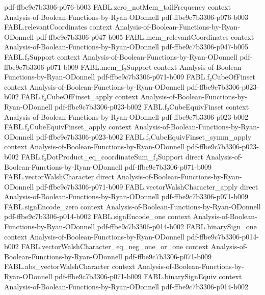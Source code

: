 \begin{theorem}
  {pdf-ffbe9c7b3306-p076-b003}
\proofstep
  {FABL.zero_notMem_tailFrequency}
  {context}
  {Analysis-of-Boolean-Functions-by-Ryan-ODonnell}
  {pdf-ffbe9c7b3306-p076-b003}
\proofstep
  {FABL.relevantCoordinates}
  {context}
  {Analysis-of-Boolean-Functions-by-Ryan-ODonnell}
  {pdf-ffbe9c7b3306-p047-b005}
\proofstep
  {FABL.mem_relevantCoordinates}
  {context}
  {Analysis-of-Boolean-Functions-by-Ryan-ODonnell}
  {pdf-ffbe9c7b3306-p047-b005}
\proofstep
  {FABL.f₂Support}
  {context}
  {Analysis-of-Boolean-Functions-by-Ryan-ODonnell}
  {pdf-ffbe9c7b3306-p071-b009}
\proofstep
  {FABL.mem_f₂Support}
  {context}
  {Analysis-of-Boolean-Functions-by-Ryan-ODonnell}
  {pdf-ffbe9c7b3306-p071-b009}
\proofstep
  {FABL.f₂CubeOfFinset}
  {context}
  {Analysis-of-Boolean-Functions-by-Ryan-ODonnell}
  {pdf-ffbe9c7b3306-p023-b002}
\proofstep
  {FABL.f₂CubeOfFinset_apply}
  {context}
  {Analysis-of-Boolean-Functions-by-Ryan-ODonnell}
  {pdf-ffbe9c7b3306-p023-b002}
\proofstep
  {FABL.f₂CubeEquivFinset}
  {context}
  {Analysis-of-Boolean-Functions-by-Ryan-ODonnell}
  {pdf-ffbe9c7b3306-p023-b002}
\proofstep
  {FABL.f₂CubeEquivFinset_apply}
  {context}
  {Analysis-of-Boolean-Functions-by-Ryan-ODonnell}
  {pdf-ffbe9c7b3306-p023-b002}
\proofstep
  {FABL.f₂CubeEquivFinset_symm_apply}
  {context}
  {Analysis-of-Boolean-Functions-by-Ryan-ODonnell}
  {pdf-ffbe9c7b3306-p023-b002}
\proofstep
  {FABL.f₂DotProduct_eq_coordinateSum_f₂Support}
  {direct}
  {Analysis-of-Boolean-Functions-by-Ryan-ODonnell}
  {pdf-ffbe9c7b3306-p071-b009}
\proofstep
  {FABL.vectorWalshCharacter}
  {direct}
  {Analysis-of-Boolean-Functions-by-Ryan-ODonnell}
  {pdf-ffbe9c7b3306-p071-b009}
\proofstep
  {FABL.vectorWalshCharacter_apply}
  {direct}
  {Analysis-of-Boolean-Functions-by-Ryan-ODonnell}
  {pdf-ffbe9c7b3306-p071-b009}
\proofstep
  {FABL.signEncode_zero}
  {context}
  {Analysis-of-Boolean-Functions-by-Ryan-ODonnell}
  {pdf-ffbe9c7b3306-p014-b002}
\proofstep
  {FABL.signEncode_one}
  {context}
  {Analysis-of-Boolean-Functions-by-Ryan-ODonnell}
  {pdf-ffbe9c7b3306-p014-b002}
\proofstep
  {FABL.binarySign_one}
  {context}
  {Analysis-of-Boolean-Functions-by-Ryan-ODonnell}
  {pdf-ffbe9c7b3306-p014-b002}
\proofstep
  {FABL.vectorWalshCharacter_eq_neg_one_or_one}
  {context}
  {Analysis-of-Boolean-Functions-by-Ryan-ODonnell}
  {pdf-ffbe9c7b3306-p071-b009}
\proofstep
  {FABL.abs_vectorWalshCharacter}
  {context}
  {Analysis-of-Boolean-Functions-by-Ryan-ODonnell}
  {pdf-ffbe9c7b3306-p071-b009}
\proofstep
  {FABL.binarySignEquiv}
  {context}
  {Analysis-of-Boolean-Functions-by-Ryan-ODonnell}
  {pdf-ffbe9c7b3306-p014-b002}

\end{theorem}
